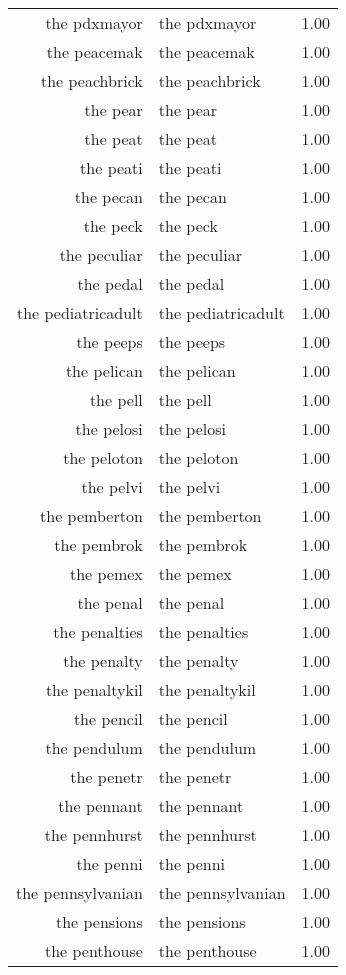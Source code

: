 \begin{table}[ht]
\begin{tabular}{rlr}
  the pdxmayor & the pdxmayor & 1.00 \\ 
  the peacemak & the peacemak & 1.00 \\ 
  the peachbrick & the peachbrick & 1.00 \\ 
  the pear & the pear & 1.00 \\ 
  the peat & the peat & 1.00 \\ 
  the peati & the peati & 1.00 \\ 
  the pecan & the pecan & 1.00 \\ 
  the peck & the peck & 1.00 \\ 
  the peculiar & the peculiar & 1.00 \\ 
  the pedal & the pedal & 1.00 \\ 
  the pediatricadult & the pediatricadult & 1.00 \\ 
  the peeps & the peeps & 1.00 \\ 
  the pelican & the pelican & 1.00 \\ 
  the pell & the pell & 1.00 \\ 
  the pelosi & the pelosi & 1.00 \\ 
  the peloton & the peloton & 1.00 \\ 
  the pelvi & the pelvi & 1.00 \\ 
  the pemberton & the pemberton & 1.00 \\ 
  the pembrok & the pembrok & 1.00 \\ 
  the pemex & the pemex & 1.00 \\ 
  the penal & the penal & 1.00 \\ 
  the penalties & the penalties & 1.00 \\ 
  the penalty & the penalty & 1.00 \\ 
  the penaltykil & the penaltykil & 1.00 \\ 
  the pencil & the pencil & 1.00 \\ 
  the pendulum & the pendulum & 1.00 \\ 
  the penetr & the penetr & 1.00 \\ 
  the pennant & the pennant & 1.00 \\ 
  the pennhurst & the pennhurst & 1.00 \\ 
  the penni & the penni & 1.00 \\ 
  the pennsylvanian & the pennsylvanian & 1.00 \\ 
  the pensions & the pensions & 1.00 \\ 
  the penthouse & the penthouse & 1.00 \\ 

\end{tabular}
\end{table}
